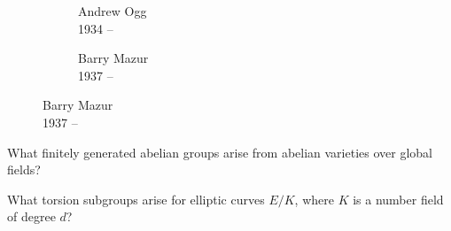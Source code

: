 \begin{frame}[plain]
\begin{figure}[h]
\begin{subfigure}{0.3\textwidth}
	\caption{Andrew Ogg \\ 1934 --}
	\end{subfigure} \quad
	\begin{subfigure}{0.3\textwidth}
	\captionsetup{labelformat=empty}
	\centering
	\caption{\hspace{0.6cm}Barry Mazur \\ \hspace{0.75cm}1937 --}
	\end{subfigure}
	\end{figure}
\end{frame}


\begin{frame}[plain]
	\begin{ques}
	What finitely generated abelian groups arise from abelian varieties over global fields? 
	\end{ques}	
\end{frame}


\begin{frame}[plain]
	\begin{ques}
	What torsion subgroups arise for elliptic curves $E/K$, where $K$ is a number field of degree $d$? 
	\end{ques}	
\end{frame}


